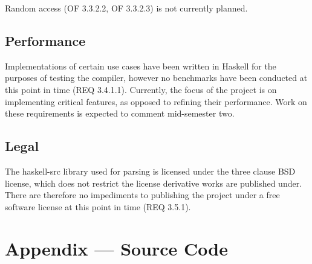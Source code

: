 \documentclass[english,onecolumn]{article}
\begin{document}
Random access (OF 3.3.2.2, OF 3.3.2.3) is not currently planned.

\subsection{Performance}
Implementations of certain use cases have been written in Haskell for the purposes of testing the compiler, however no benchmarks have been conducted at this point in time (REQ 3.4.1.1). Currently, the focus of the project is on implementing critical features, as opposed to refining their performance. Work on these requirements is expected to comment mid-semester two.

\subsection{Legal}
The haskell-src library used for parsing is licensed under the three clause BSD license, which does not restrict the license derivative works are published under. There are therefore no impediments to publishing the project under a free software license at this point in time (REQ 3.5.1).

\appendix
\section{Appendix --- Source Code}


\end{document}
